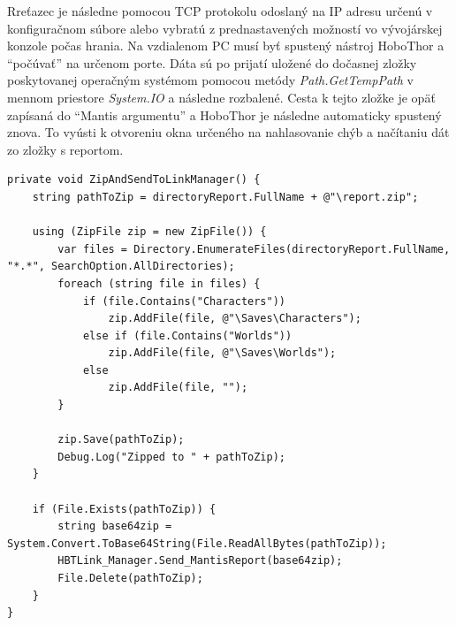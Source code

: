 \documentclass[slovak, bachelorpractice]{diploma}
\begin{document}
Rreťazec je následne pomocou TCP protokolu odoslaný na IP adresu určenú v konfiguračnom súbore alebo vybratú z prednastavených možností vo vývojárskej konzole počas hrania. Na vzdialenom PC musí byť spustený nástroj HoboThor a \enquote{počúvať} na určenom porte. Dáta sú po prijatí uložené do dočasnej zložky poskytovanej operačným systémom pomocou metódy \textit{Path.GetTempPath} v mennom priestore \textit{System.IO} a následne rozbalené. Cesta k tejto zložke je opäť zapísaná do \enquote{Mantis argumentu} a HoboThor je následne automaticky spustený znova. To vyústi k otvoreniu okna určeného na nahlasovanie chýb a načítaniu dát zo zložky s reportom.
\vspace{10pt}
\begin{lstlisting}[label=src:Zip,caption={Metóda ZipAndSendToLinkManager triedy ReportingManager}]
private void ZipAndSendToLinkManager() {
    string pathToZip = directoryReport.FullName + @"\report.zip";

    using (ZipFile zip = new ZipFile()) {
        var files = Directory.EnumerateFiles(directoryReport.FullName, "*.*", SearchOption.AllDirectories);
        foreach (string file in files) {
            if (file.Contains("Characters"))
                zip.AddFile(file, @"\Saves\Characters");
            else if (file.Contains("Worlds"))
                zip.AddFile(file, @"\Saves\Worlds");
            else
                zip.AddFile(file, "");
        }

        zip.Save(pathToZip);
        Debug.Log("Zipped to " + pathToZip);
    }

    if (File.Exists(pathToZip)) {
        string base64zip = System.Convert.ToBase64String(File.ReadAllBytes(pathToZip));
        HBTLink_Manager.Send_MantisReport(base64zip);
        File.Delete(pathToZip);
    }
}
\end{lstlisting}
\vspace{5pt}
\end{document}
